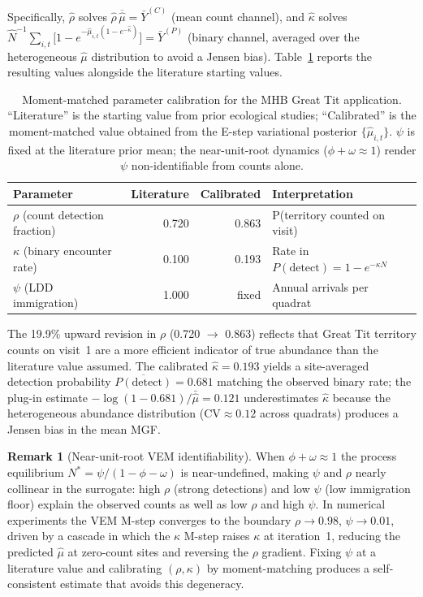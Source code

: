 \documentclass[review,12pt]{elsarticle}
\theoremstyle{definition}
\newtheorem{remark}{Remark}
\begin{document}
Specifically, $\hat\rho$ solves $\hat\rho\,\overline{\hat\mu}=\bar Y^{(C)}$
(mean count channel), and $\hat\kappa$ solves
$\widehat{N}^{-1}\sum_{i,t}\bigl[1-e^{-\hat\mu_{i,t}(1-e^{-\hat\kappa})}\bigr]=\bar Y^{(P)}$
(binary channel, averaged over the heterogeneous $\hat\mu$ distribution
to avoid a Jensen bias).  Table~\ref{tab:mhb-params} reports the resulting
values alongside the literature starting values.

\begin{table}[ht]
\centering
\caption{Moment-matched parameter calibration for the MHB Great Tit application.
``Literature'' is the starting value from prior ecological studies;
``Calibrated'' is the moment-matched value obtained from the E-step
variational posterior $\{\hat\mu_{i,t}\}$.
$\psi$ is fixed at the literature prior mean; the near-unit-root dynamics
($\phi+\omega\approx1$) render $\psi$ non-identifiable from counts alone.}
\label{tab:mhb-params}
\begin{tabular}{lrrl}
\toprule
Parameter & Literature & Calibrated & Interpretation \\
\midrule
$\rho$ (count detection fraction) & 0.720 & 0.863 & P(territory counted on visit) \\
$\kappa$ (binary encounter rate)  & 0.100 & 0.193 & Rate in $P(\text{detect})=1-e^{-\kappa N}$ \\
$\psi$ (LDD immigration)          & 1.000 & fixed  & Annual arrivals per quadrat \\
\bottomrule
\end{tabular}
\end{table}

\noindent
The 19.9\% upward revision in $\rho$ (0.720 $\to$ 0.863) reflects that
Great Tit territory counts on visit~1 are a more efficient indicator of
true abundance than the literature value assumed.  The calibrated
$\hat\kappa=0.193$ yields a site-averaged detection probability
$\overline{P(\text{detect})}=0.681$ matching the observed binary rate;
the plug-in estimate $-\log(1-0.681)/\bar{\hat\mu}=0.121$ underestimates
$\hat\kappa$ because the heterogeneous abundance distribution
($\mathrm{CV}\approx0.12$ across quadrats) produces a Jensen bias in the
mean MGF.

\begin{remark}[Near-unit-root VEM identifiability]
\label{rem:near-unit-root}
When $\phi+\omega\approx1$ the process equilibrium
$N^*=\psi/(1-\phi-\omega)$ is near-undefined, making $\psi$ and $\rho$
nearly collinear in the surrogate: high $\rho$ (strong detections) and
low $\psi$ (low immigration floor) explain the observed counts as well as
low $\rho$ and high $\psi$.  In numerical experiments the VEM M-step
converges to the boundary $\rho\to0.98$, $\psi\to0.01$, driven by a
cascade in which the $\kappa$ M-step raises $\kappa$ at iteration~1,
reducing the predicted $\hat\mu$ at zero-count sites and reversing the
$\rho$ gradient.  Fixing $\psi$ at a literature value and calibrating
$(\rho,\kappa)$ by moment-matching produces a self-consistent estimate
that avoids this degeneracy.
\end{remark}
\end{document}
